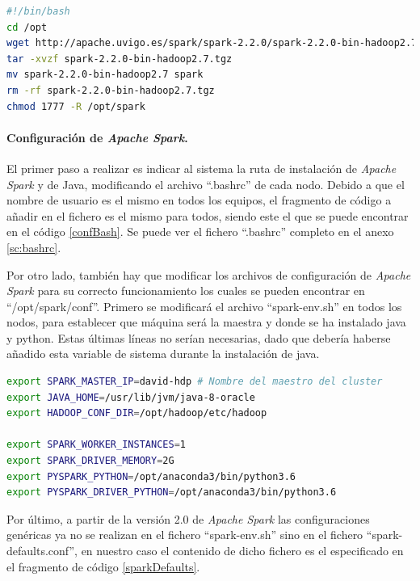 \begin{lstlisting}[label=insSpark,language=sh,frame=single,caption=Script de instalación de \textit{Apache Spark}.]
#!/bin/bash
cd /opt
wget http://apache.uvigo.es/spark/spark-2.2.0/spark-2.2.0-bin-hadoop2.7.tgz
tar -xvzf spark-2.2.0-bin-hadoop2.7.tgz 
mv spark-2.2.0-bin-hadoop2.7 spark
rm -rf spark-2.2.0-bin-hadoop2.7.tgz
chmod 1777 -R /opt/spark
\end{lstlisting}

\paragraph{Configuración de \textit{Apache Spark}.}
El primer paso a realizar es indicar al sistema la ruta de instalación de \textit{Apache Spark} y de Java, modificando el archivo ``.bashrc'' de cada nodo. Debido a que el nombre de usuario es el mismo en todos los equipos, el fragmento de código a añadir en el fichero es el mismo para todos, siendo este el que se puede encontrar en el código \ref{confBash}. Se puede ver el fichero ``.bashrc'' completo en el anexo \ref{sc:bashrc}.

Por otro lado, también hay que modificar los archivos de configuración de \textit{Apache Spark} para su correcto funcionamiento los cuales se pueden encontrar en ``/opt/spark/conf''. Primero se modificará el archivo ``spark-env.sh'' en todos los nodos, para establecer que máquina será la maestra y donde se ha instalado java y python. Estas últimas líneas no serían necesarias, dado que debería haberse añadido esta variable de sistema durante la instalación de java.
\clearpage
\begin{lstlisting}[label=confBash,language=sh,frame=single,caption=Líneas a añadir en el fichero ``spark-env.sh'' para configurar \textit{Apache Spark} en el modo distribuido.]
export SPARK_MASTER_IP=david-hdp # Nombre del maestro del cluster
export JAVA_HOME=/usr/lib/jvm/java-8-oracle
export HADOOP_CONF_DIR=/opt/hadoop/etc/hadoop

export SPARK_WORKER_INSTANCES=1
export SPARK_DRIVER_MEMORY=2G
export PYSPARK_PYTHON=/opt/anaconda3/bin/python3.6
export PYSPARK_DRIVER_PYTHON=/opt/anaconda3/bin/python3.6
\end{lstlisting}

Por último, a partir de la versión 2.0 de \textit{Apache Spark} las configuraciones genéricas ya no se realizan en el fichero ``spark-env.sh'' sino en el fichero ``spark-defaults.conf'', en nuestro caso el contenido de dicho fichero es el especificado en el fragmento de código \ref{sparkDefaults}.

